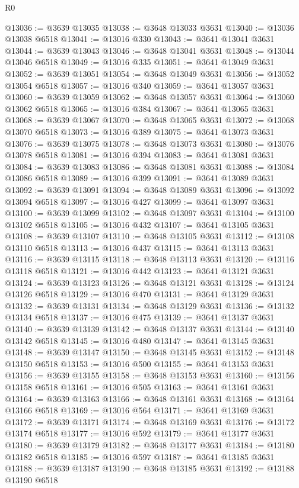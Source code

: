 \begin{lexlean}{R0}
\begin{coremodule}
@13036 := @3639 @13035
@13038 := @3648 @13033 @3631
@13040 := @13036 @13038 @6518
@13041 := @13016 @330
@13043 := @3641 @13041 @3631
@13044 := @3639 @13043
@13046 := @3648 @13041 @3631
@13048 := @13044 @13046 @6518
@13049 := @13016 @335
@13051 := @3641 @13049 @3631
@13052 := @3639 @13051
@13054 := @3648 @13049 @3631
@13056 := @13052 @13054 @6518
@13057 := @13016 @340
@13059 := @3641 @13057 @3631
@13060 := @3639 @13059
@13062 := @3648 @13057 @3631
@13064 := @13060 @13062 @6518
@13065 := @13016 @384
@13067 := @3641 @13065 @3631
@13068 := @3639 @13067
@13070 := @3648 @13065 @3631
@13072 := @13068 @13070 @6518
@13073 := @13016 @389
@13075 := @3641 @13073 @3631
@13076 := @3639 @13075
@13078 := @3648 @13073 @3631
@13080 := @13076 @13078 @6518
@13081 := @13016 @394
@13083 := @3641 @13081 @3631
@13084 := @3639 @13083
@13086 := @3648 @13081 @3631
@13088 := @13084 @13086 @6518
@13089 := @13016 @399
@13091 := @3641 @13089 @3631
@13092 := @3639 @13091
@13094 := @3648 @13089 @3631
@13096 := @13092 @13094 @6518
@13097 := @13016 @427
@13099 := @3641 @13097 @3631
@13100 := @3639 @13099
@13102 := @3648 @13097 @3631
@13104 := @13100 @13102 @6518
@13105 := @13016 @432
@13107 := @3641 @13105 @3631
@13108 := @3639 @13107
@13110 := @3648 @13105 @3631
@13112 := @13108 @13110 @6518
@13113 := @13016 @437
@13115 := @3641 @13113 @3631
@13116 := @3639 @13115
@13118 := @3648 @13113 @3631
@13120 := @13116 @13118 @6518
@13121 := @13016 @442
@13123 := @3641 @13121 @3631
@13124 := @3639 @13123
@13126 := @3648 @13121 @3631
@13128 := @13124 @13126 @6518
@13129 := @13016 @470
@13131 := @3641 @13129 @3631
@13132 := @3639 @13131
@13134 := @3648 @13129 @3631
@13136 := @13132 @13134 @6518
@13137 := @13016 @475
@13139 := @3641 @13137 @3631
@13140 := @3639 @13139
@13142 := @3648 @13137 @3631
@13144 := @13140 @13142 @6518
@13145 := @13016 @480
@13147 := @3641 @13145 @3631
@13148 := @3639 @13147
@13150 := @3648 @13145 @3631
@13152 := @13148 @13150 @6518
@13153 := @13016 @500
@13155 := @3641 @13153 @3631
@13156 := @3639 @13155
@13158 := @3648 @13153 @3631
@13160 := @13156 @13158 @6518
@13161 := @13016 @505
@13163 := @3641 @13161 @3631
@13164 := @3639 @13163
@13166 := @3648 @13161 @3631
@13168 := @13164 @13166 @6518
@13169 := @13016 @564
@13171 := @3641 @13169 @3631
@13172 := @3639 @13171
@13174 := @3648 @13169 @3631
@13176 := @13172 @13174 @6518
@13177 := @13016 @592
@13179 := @3641 @13177 @3631
@13180 := @3639 @13179
@13182 := @3648 @13177 @3631
@13184 := @13180 @13182 @6518
@13185 := @13016 @597
@13187 := @3641 @13185 @3631
@13188 := @3639 @13187
@13190 := @3648 @13185 @3631
@13192 := @13188 @13190 @6518

\end{coremodule}
\end{lexlean}
